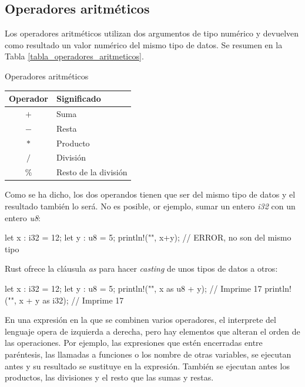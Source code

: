 \subsection{Operadores aritméticos}
Los operadores aritméticos utilizan dos argumentos de tipo numérico y devuelven como resultado un valor numérico del mismo tipo de datos. Se resumen en la Tabla \ref{tabla_operadores_aritmeticos}.

\begin{center}
   \begin{mytable}[label=tabla_operadores_aritmeticos]{\centering\footnotesize Operadores aritméticos}
      \footnotesize
      \begin{tabular}{c l}
         \hline
         \textbf{Operador} & \textbf{Significado} \\ \hline
         $+$ & Suma \\
         $-$ & Resta \\
         $*$ & Producto \\
         $/$ & División \\
         $\%$ & Resto de la división \\
      \end{tabular}
   \end{mytable}
\end{center}


Como se ha dicho, los dos operandos tienen que ser del mismo tipo de datos y el resultado también lo será. No es posible, or ejemplo, sumar un entero \textit{i32} con un entero \textit{u8}:

\vspace{0.7em}
\begin{Codigo}
let x : i32 = 12;
let y : u8 = 5;
println!("{}", x+y); // ERROR, no son del mismo tipo
\end{Codigo}

Rust ofrece la cláusula \textit{as} para hacer \textit{casting} de unos tipos de datos a otros:

\vspace{0.7em}
\begin{Codigo}
let x : i32 = 12;
let y : u8 = 5;
println!("{}", x as u8 + y); // Imprime 17
println!("{}", x + y as i32); // Imprime 17
\end{Codigo}

En una expresión en la que se combinen varios operadores, el interprete del lenguaje opera de izquierda a derecha, pero hay elementos que alteran el orden de las operaciones. Por ejemplo, las expresiones que estén encerradas entre paréntesis, las llamadas a funciones o los nombre de otras variables, se ejecutan antes y su resultado se sustituye en la expresión. También se ejecutan antes los productos, las divisiones y el resto que las sumas y restas. 

